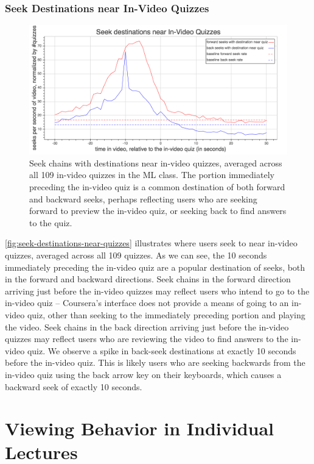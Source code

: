 \documentclass{sigchi}
\begin{document}
\subsubsection{Seek Destinations near In-Video Quizzes}

\begin{figure}
\includegraphics[width=1.0\columnwidth]{seek-destinations-near-quizzes}
\caption{Seek chains with destinations near in-video quizzes, averaged across all 109 in-video quizzes in the ML class. The portion immediately preceding the in-video quiz is a common destination of both forward and backward seeks, perhaps reflecting users who are seeking forward to preview the in-video quiz, or seeking back to find answers to the quiz.}
\label{fig:seek-destinations-near-quizzes}
\end{figure}

\autoref{fig:seek-destinations-near-quizzes} illustrates where users seek to near in-video quizzes, averaged across all 109 quizzes. As we can see, the 10 seconds immediately preceding the in-video quiz are a popular destination of seeks, both in the forward and backward directions. Seek chains in the forward direction arriving just before the in-video quizzes may reflect users who intend to go to the in-video quiz -- Coursera's interface does not provide a means of going to an in-video quiz, other than seeking to the immediately preceding portion and playing the video. Seek chains in the back direction arriving just before the in-video quizzes may reflect users who are reviewing the video to find answers to the in-video quiz. We observe a spike in back-seek destinations at exactly 10 seconds before the in-video quiz. This is likely users who are seeking backwards from the in-video quiz using the back arrow key on their keyboards, which causes a backward seek of exactly 10 seconds.

\section{Viewing Behavior in Individual Lectures}
\end{document}
